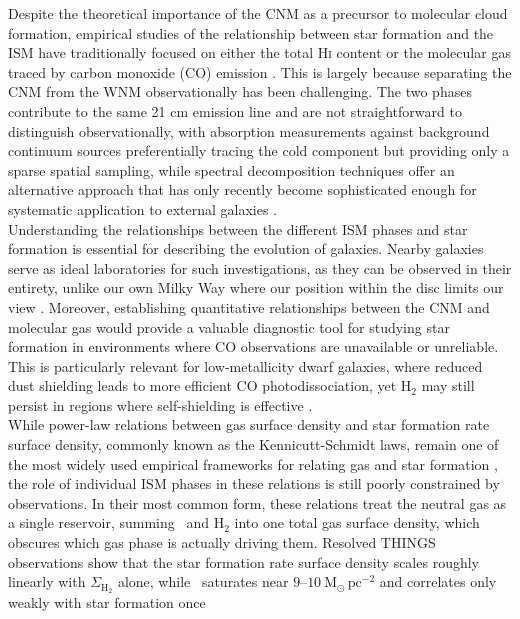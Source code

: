 Despite the theoretical importance of the CNM as a precursor to molecular cloud formation, empirical studies of the relationship between star formation and the ISM have traditionally focused on either the total \textrm{H\textsc{i}} content or the molecular gas traced by carbon monoxide (CO) emission \citep{Kennicutt1998, Fbigiel2008, Leroy2008}. This is largely because separating the CNM from the WNM observationally has been challenging. The two phases contribute to the same 21 cm emission line and are not straightforward to distinguish observationally, with absorption measurements against background continuum sources preferentially tracing the cold component but providing only a sparse spatial sampling, while spectral decomposition techniques offer an alternative approach that has only recently become sophisticated enough for systematic application to external galaxies \citep{Heiles2003a, Marchal2019, Syed2020}. \\\indent
Understanding the relationships between the different ISM phases and star formation is essential for describing the evolution of galaxies. Nearby galaxies serve as ideal laboratories for such investigations, as they can be observed in their entirety, unlike our own Milky Way where our position within the disc limits our view \citep{Leroy2008}. Moreover, establishing quantitative relationships between the CNM and molecular gas would provide a valuable diagnostic tool for studying star formation in environments where CO observations are unavailable or unreliable. This is particularly relevant for low-metallicity dwarf galaxies, where reduced dust shielding leads to more efficient CO photodissociation, yet H$_2$ may still persist in regions where self-shielding is effective \citep{Bolatto2013}.\\\indent
While power-law relations between gas surface density and star formation rate surface density, commonly known as the Kennicutt-Schmidt laws, remain one of the most widely used empirical frameworks for relating gas and star formation \citep{Schmidt1959, Kennicutt1998}, the role of individual ISM phases in these relations is still poorly constrained by observations. In their most common form, these relations
treat the neutral gas as a single reservoir, summing \HI\ and H$_2$ into one total gas
surface density, which obscures which gas phase is actually driving them. Resolved
THINGS observations show that the star formation rate surface density scales roughly
linearly with $\Sigma_{\mathrm{H_2}}$ alone, while \HI\ saturates near
$9$--$10\ \mathrm{M_\odot\,pc^{-2}}$ and correlates only weakly with star formation once

